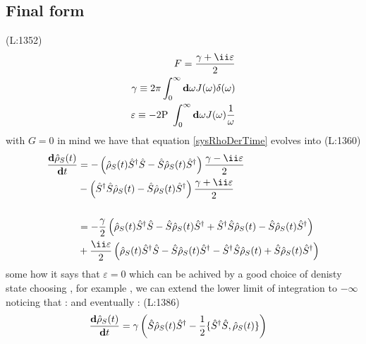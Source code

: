 \subsection{Final form }
(L:1352)
\begin{equation}
\begin{split}
F =\frac{\gamma +\ii \varepsilon }{2}\\
\gamma \equiv 2\pi \int _{0}^{\infty }\bold{d}\omega J (\omega )\delta (\omega )\\
\varepsilon \equiv -2\text{P }\int _{0}^{\infty }\bold{d}\omega J (\omega )\frac{1}{\omega }\end{split}
\end{equation}
 with 
 $ G =0 $  in mind we have that equation 
\eqref{sysRhoDerTime} evolves into
(L:1360)
\begin{equation}
\begin{split}
\dfrac{\bold{d}\hat{\rho }_{S }(t )}{\bold{d}t }&=-\left(\hat{\rho }_{S }(t )\hat{S }^\dagger \hat{S }-\hat{S }\hat{\rho }_{S }(t )\hat{S }^\dagger \right)\frac{\gamma -\ii \varepsilon }{2}\\
&-\left(\hat{S }^\dagger \hat{S }\hat{\rho }_{S }(t )-\hat{S }\hat{\rho }_{S }(t )\hat{S }^\dagger \right)\frac{\gamma +\ii \varepsilon }{2}\\
\\
&=-\frac{\gamma }{2}\left(\hat{\rho }_{S }(t )\hat{S }^\dagger \hat{S }-\hat{S }\hat{\rho }_{S }(t )\hat{S }^\dagger +\hat{S }^\dagger \hat{S }\hat{\rho }_{S }(t )-\hat{S }\hat{\rho }_{S }(t )\hat{S }^\dagger \right)\\
&+\frac{\ii \varepsilon }{2}\left(\hat{\rho }_{S }(t )\hat{S }^\dagger \hat{S }-\hat{S }\hat{\rho }_{S }(t )\hat{S }^\dagger -\hat{S }^\dagger \hat{S }\hat{\rho }_{S }(t )+\hat{S }\hat{\rho }_{S }(t )\hat{S }^\dagger \right)\end{split}
\end{equation}
 some how it says that 
 $ \varepsilon =0 $  which can be achived by a good choice of denisty state
 choosing , for example , we can extend the lower limit of integration to 
 $ -\infty  $  noticing that :  
 and eventually : 
(L:1386)
\begin{equation}
\begin{split}
\label{explicitTimedRho}\dfrac{\bold{d}\hat{\rho }_{S }(t )}{\bold{d}t }&=\gamma \left(\hat{S }\hat{\rho }_{S }(t )\hat{S }^\dagger -\frac{1}{2}\{\hat{S }^\dagger \hat{S },\hat{\rho }_{S }(t )\}\right)\end{split}
\end{equation}
